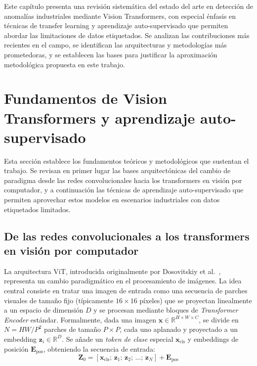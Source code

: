 Este capítulo presenta una revisión sistemática del estado del arte en detección de anomalías industriales mediante Vision Transformers, con especial énfasis en técnicas de transfer learning y aprendizaje auto-supervisado que permiten abordar las limitaciones de datos etiquetados. Se analizan las contribuciones más recientes en el campo, se identifican las arquitecturas y metodologías más prometedoras, y se establecen las bases para justificar la aproximación metodológica propuesta en este trabajo.


\section[Fundamentos de ViT y aprendizaje auto-supervisado]{Fundamentos de Vision Transformers y aprendizaje auto-supervisado}

Esta sección establece los fundamentos teóricos y metodológicos que sustentan el trabajo. Se revisan en primer lugar las bases arquitectónicas del cambio de paradigma desde las redes convolucionales hacia los transformers en visión por computador, y a continuación las técnicas de aprendizaje auto-supervisado que permiten aprovechar estos modelos en escenarios industriales con datos etiquetados limitados.

\subsection{De las redes convolucionales a los transformers en visión por computador}

La arquitectura \acrfull{ViT}, introducida originalmente por Dosovitskiy et al.~\cite{dosovitskiy2021vit}, representa un cambio paradigmático en el procesamiento de imágenes. La idea central consiste en tratar una imagen de entrada como una secuencia de parches visuales de tamaño fijo (típicamente $16\times16$ píxeles) que se proyectan linealmente a un espacio de dimensión $D$ y se procesan mediante bloques de \textit{Transformer Encoder} estándar. Formalmente, dada una imagen $\mathbf{x} \in \mathbb{R}^{H \times W \times C}$, se divide en $N = HW/P^2$ parches de tamaño $P\times P$, cada uno aplanado y proyectado a un embedding $\mathbf{z}_i \in \mathbb{R}^D$. Se añade un \textit{token de clase} especial $\mathbf{x}_\text{cls}$ y embeddings de posición $\mathbf{E}_\text{pos}$, obteniendo la secuencia de entrada:
\[
\mathbf{Z}_0 = [\mathbf{x}_\text{cls};\, \mathbf{z}_1;\, \mathbf{z}_2;\, \ldots;\, \mathbf{z}_N] + \mathbf{E}_\text{pos}
\]

